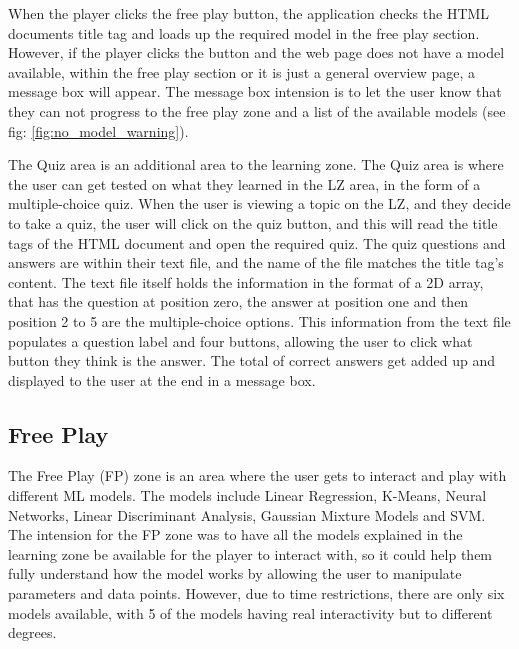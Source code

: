 		When the player clicks the free play button, the application checks the HTML documents title tag and loads up the required model in the free play section. However, if the player clicks the button and the web page does not have a model available, within the free play section or it is just a general overview page, a message box will appear. The message box intension is to let the user know that they can not progress to the free play zone and a list of the available models (see fig: \ref{fig:no_model_warning}).
	
		The Quiz area is an additional area to the learning zone. The Quiz area is where the user can get tested on what they learned in the LZ area, in the form of a multiple-choice quiz. When the user is viewing a topic on the LZ, and they decide to take a quiz, the user will click on the quiz button, and this will read the title tags of the HTML document and open the required quiz. The quiz questions and answers are within their text file, and the name of the file matches the title tag's content. The text file itself holds the information in the format of a 2D array, that has the question at position zero, the answer at position one and then position 2 to 5 are the multiple-choice options. This information from the text file populates a question label and four buttons, allowing the user to click what button they think is the answer. The total of correct answers get added up and displayed to the user at the end in a message box.
	
	\subsection{Free Play}
	
		The Free Play (FP) zone is an area where the user gets to interact and play with different ML models. The models include Linear Regression, K-Means, Neural Networks, Linear Discriminant Analysis, Gaussian Mixture Models and SVM. The intension for the FP zone was to have all the models explained in the learning zone be available for the player to interact with, so it could help them fully understand how the model works by allowing the user to manipulate parameters and data points. However, due to time restrictions, there are only six models available, with 5 of the models having real interactivity but to different degrees.
		
